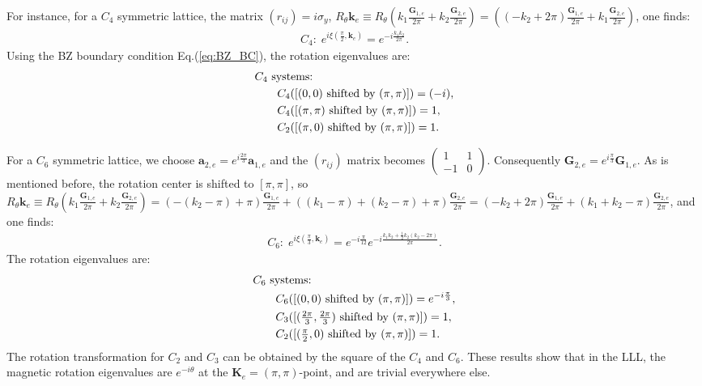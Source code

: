 \begin{subappendices}
For instance, for a $C_4$ symmetric lattice, the matrix $(r_{ij})=i\sigma_y$, $R_{\theta}\mathbf{k}_e\equiv R_\theta(k_1 \frac{\mathbf G_{1,e}}{2\pi} + k_2 \frac{\mathbf G_{2,e}}{2\pi})=((-k_2+2\pi) \frac{\mathbf G_{1,e}}{2\pi} + k_1 \frac{\mathbf G_{2,e}}{2\pi})$, one finds:
\begin{align}
C_4:\; e^{i\xi(\frac{\pi}{2},\mathbf k_e)}=e^{-i \frac{k_1 k_2}{2\pi}}.
\end{align}
Using the BZ boundary condition Eq.(\ref{eq:BZ_BC}), the rotation eigenvalues are:
\begin{align}
&C_4 \text{ systems: }\notag\\
&\quad\quad C_4([(0,0)\text{ shifted by }(\pi,\pi)])=(-i), \notag\\
&\quad\quad C_4([(\pi,\pi)\text{ shifted by }(\pi,\pi)])=1,\notag\\
&\quad\quad C_2([(\pi,0)\text{ shifted by }(\pi,\pi)])=1.
\end{align}

For a $C_6$ symmetric lattice, we choose $\mathbf a_{2,e}=e^{i\frac{2\pi}{3}}\mathbf a_{1,e}$ and the $(r_{ij})$ matrix becomes $\begin{pmatrix} 1& 1 \\ -1 & 0\end{pmatrix}$. Consequently $\mathbf G_{2,e}=e^{i\frac{\pi}{3}}\mathbf G_{1,e}$. As is mentioned before, the rotation center is shifted to $[\pi,\pi]$, so $R_\theta\mathbf k_e\equiv R_{\theta} (k_1 \frac{\mathbf G_{1,e}}{2\pi} + k_2 \frac{\mathbf G_{2,e}}{2\pi})=(-(k_2-\pi)+\pi) \frac{\mathbf G_{1,e}}{2\pi} + ((k_1-\pi)+(k_2-\pi)+\pi) \frac{\mathbf G_{2,e}}{2\pi}=(-k_2+2\pi) \frac{\mathbf G_{1,e}}{2\pi} + (k_1+k_2-\pi) \frac{\mathbf G_{2,e}}{2\pi}$, and one finds:
\begin{align}
C_6:\; e^{i\xi(\frac{\pi}{3},\mathbf k_e)}=e^{-i\frac{\pi}{12}}e^{-i \frac{k_1 k_2+\frac{1}{2}k_2(k_2-2\pi)}{2\pi}}.
\end{align}
The rotation eigenvalues are:
\begin{align}
&C_6\text{ systems: }\notag\\
&\quad\quad C_6([(0,0)\text{ shifted by }(\pi,\pi)])=e^{-i\frac{\pi}{3}},\notag\\
&\quad\quad C_3([(\tfrac{2\pi}{3},\tfrac{2\pi}{3})\text{ shifted by }(\pi,\pi)])=1,\notag\\
&\quad\quad C_2([(\tfrac{\pi}{2},0)\text{ shifted by }(\pi,\pi)])=1.
\end{align}
The rotation transformation for $C_2$ and $C_3$ can be obtained by the square of the $C_4$ and $C_6$. These results show that in the LLL, the magnetic rotation eigenvalues are $e^{-i\theta}$ at the $\mathbf K_e=(\pi,\pi)$-point, and are trivial everywhere else.


\end{subappendices}
